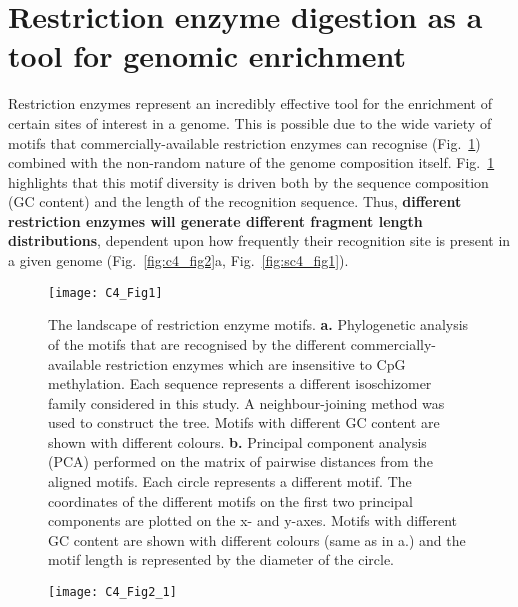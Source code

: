\smallskip

\section{Restriction enzyme digestion as a tool for genomic enrichment}

\smallskip

Restriction enzymes represent an incredibly effective tool for the enrichment of certain sites of interest in a genome. This is possible due to the wide variety of motifs that commercially-available restriction enzymes can recognise (Fig.~\ref{fig:c4_fig1}) combined with the non-random nature of the genome composition itself. Fig.~\ref{fig:c4_fig1} highlights that this motif diversity is driven both by the sequence composition (\acrshort{GC content}) and the length of the recognition sequence. Thus, \textbf{different restriction enzymes will generate different fragment length distributions}, dependent upon how frequently their recognition site is present in a given genome (Fig.~\ref{fig:c4_fig2}a, Fig.~\ref{fig:sc4_fig1}).

\vspace{3.5mm}


\begin{figure}[htbp!] 
	\centering    
	\texttt{[image: C4\_Fig1]}
	\vspace*{1mm}
	\caption[The landscape of restriction enzyme motifs]{The landscape of restriction enzyme motifs. \textbf{a.} Phylogenetic analysis of the motifs that are recognised by the different commercially-available restriction enzymes which are insensitive to CpG methylation. Each sequence represents a different isoschizomer family considered in this study. A neighbour-joining method was used to construct the tree. Motifs with different GC content are shown with different colours. \textbf{b.} Principal component analysis (\acrshort{PCA}) performed on the matrix of pairwise distances from the aligned motifs. Each circle represents a different motif. The coordinates of the different motifs on the first two principal components are plotted on the x- and y-axes. Motifs with different GC content are shown with different colours (same as in a.) and the motif length is represented by the diameter of the circle.}
	\label{fig:c4_fig1}
\end{figure}

\begin{figure}[htbp!] 
	\centering 
	\vspace*{3mm}   
	\texttt{[image: C4\_Fig2\_1]}
	\label{fig:c4_fig2_1}
\end{figure}


